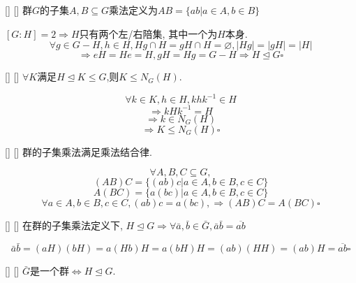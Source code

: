 \documentclass[UTF8]{ctexart}
\begin{document}
		\begin{dfn}
            []
            {}
            []
            []
			群$G$的子集$A,B\subseteq G$乘法定义为$AB=\{ab|a\in A, b\in B\}$
		\end{dfn}

            \begin{prf}
			
			$[G:H]=2\Longrightarrow H$只有两个左/右陪集, 其中一个为$H$本身. 
			\[\forall g\in G-H, h\in H, Hg\cap H=gH\cap H=\varnothing,|Hg|=|gH|=|H|\]
			\[\Longrightarrow eH=He=H, gH=Hg=G-H\Longrightarrow H\trianglelefteq G\square\]
		\end{prf}

		\begin{ppt}
            []
            {}
            []
            []
			$\forall K$满足$H \unlhd K \leq G$,则$K \leq N_G(H)$.
		\end{ppt}

		\begin{prf}
			\[\forall k\in K, h\in H, khk^{-1}\in H\]
			\[\Longrightarrow kHk^{-1}=H\]
			\[\Longrightarrow k\in N_G(H)\]
			\[\Longrightarrow K\leq N_G(H)\square\]
		\end{prf}
		
		\begin{ppt}
            []
            {}
            []
            []
			群的子集乘法满足乘法结合律. 
		\end{ppt}
		
		\begin{prf}
			\[\forall A,B,C\subseteq G, \]
			\[(AB)C=\{(ab)c|a\in A, b\in B, c\in C\}\]
			\[A(BC)=\{a(bc)|a\in A, b\in B, c\in C\}\]
			\[\forall a\in A, b\in B, c\in C, (ab)c=a(bc), \Longrightarrow (AB)C=A(BC)\square\]
		\end{prf}
  
		\begin{ppt}
            []
            {}
            []
            []
			在群的子集乘法定义下, $H\trianglelefteq G\Longrightarrow \forall \bar{a},\bar{b}\in\bar{G}, \bar{a}\bar{b}=\overline{ab}$
		\end{ppt}
		
		\begin{prf}
			\[\bar{a}\bar{b}=(aH)(bH)=a(Hb)H=a(bH)H=(ab)(HH)=(ab)H=\overline{ab}\square\]
		\end{prf}
  
		\begin{ppt}
            []
            {}
            []
            []
			$\bar{G}$是一个群$\iff H\trianglelefteq G$. 
		\end{ppt}
		
\end{document}
